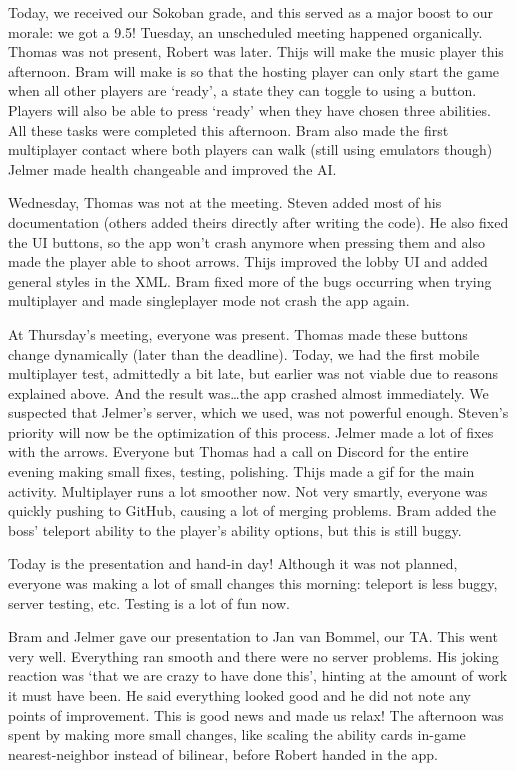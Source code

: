 \documentclass[../main.tex]{subfiles}
\begin{document}
Today, we received our Sokoban grade, and this served as a major boost to our morale: we got a 9.5! 
\bigbreak\noindent
Tuesday, an unscheduled meeting happened organically. Thomas was not present, Robert was later. Thijs will make the music player this afternoon. Bram will make is so that the hosting player can only start the game when all other players are `ready', a state they can toggle to using a button. Players will also be able to press `ready' when they have chosen three abilities. All these tasks were completed this afternoon. Bram also made the first multiplayer contact where both players can walk (still using emulators though) Jelmer made health changeable and improved the AI.

\bigbreak\noindent
Wednesday, Thomas was not at the meeting. Steven added most of his documentation (others added theirs directly after writing the code). He also fixed the UI buttons, so the app won't crash anymore when pressing them and also made the player able to shoot arrows. Thijs improved the lobby UI and added general styles in the XML. Bram fixed more of the bugs occurring when trying multiplayer and made singleplayer mode not crash the app again. 

\bigbreak\noindent
At Thursday's meeting, everyone was present. Thomas made these buttons change dynamically (later than the deadline). Today, we had the first mobile multiplayer test, admittedly a bit late, but earlier was not viable due to reasons explained above. And the result was\dots the app crashed almost immediately. We suspected that Jelmer's server, which we used, was not powerful enough. Steven's priority will now be the optimization of this process. Jelmer made a lot of fixes with the arrows. Everyone but Thomas had a call on Discord for the entire evening making small fixes, testing, polishing. Thijs made a gif for the main activity. Multiplayer runs a lot smoother now. Not very smartly, everyone was quickly pushing to GitHub, causing a lot of merging problems. Bram added the boss' teleport ability to the player's ability options, but this is still buggy.

\bigbreak\noindent
Today is the presentation and hand-in day! Although it was not planned, everyone was making a lot of small changes this morning: teleport is less buggy, server testing, etc. Testing is a lot of fun now.

Bram and Jelmer gave our presentation to Jan van Bommel, our TA. This went very well. Everything ran smooth and there were no server problems. His joking reaction was `that we are crazy to have done this', hinting at the amount of work it must have been. He said everything looked good and he did not note any points of improvement. This is good news and made us relax! The afternoon was spent by making more small changes, like scaling the ability cards in-game nearest-neighbor instead of bilinear, before Robert handed in the app.
\end{document}
